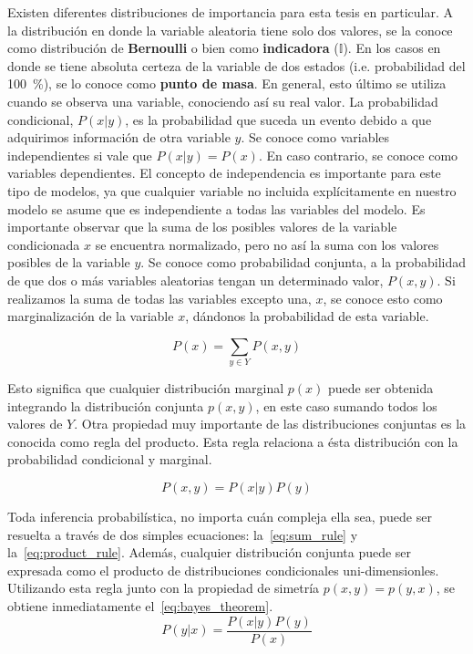 \documentclass[11pt,twoside, spanish]{report} %
\begin{document}
Existen diferentes distribuciones de importancia para esta tesis en particular.
A la distribuci\'on en donde la variable aleatoria tiene solo dos valores, se la conoce como distribuci\'on de \textbf{Bernoulli} o bien como \textbf{indicadora} ($\mathbb{I}$).
En los casos en donde se tiene absoluta certeza de la variable de dos estados (i.e. probabilidad del \SI{100}{\percent}),  se lo conoce como \textbf{punto de masa}.
En general, esto \'ultimo se utiliza cuando se observa una variable, conociendo as\'i su real valor.
La probabilidad condicional, $P(x|y)$, es la probabilidad que suceda un evento debido a que adquirimos  informaci\'on de otra variable $y$.
Se conoce como variables independientes si vale que $P(x|y) = P(x)$.
En caso contrario, se conoce como variables dependientes.
El concepto de independencia es importante para este tipo de modelos, ya que cualquier variable no incluida expl\'icitamente en nuestro modelo se asume que es independiente a todas las variables del modelo.
Es importante observar que la suma de los posibles valores de la variable condicionada $x$ se encuentra normalizado, pero no as\'i la suma con los valores posibles de la variable $y$.
Se conoce como probabilidad conjunta, a la probabilidad de que dos o m\'as variables aleatorias tengan un determinado valor, $P(x,y)$.
Si realizamos la suma de todas las variables excepto una, $x$, se conoce esto como marginalizaci\'on de la variable $x$, d\'andonos la probabilidad de esta variable.


\begin{equation} \label{eq:sum_rule}
\tag{regla de la suma}
P(x) = \sum_{y \in Y} P(x,y)
\end{equation}

Esto significa que cualquier distribuci\'on marginal $p(x)$ puede ser obtenida integrando la distribuci\'on conjunta $p(x,y)$, en este caso sumando todos los valores de $Y$.
Otra propiedad muy importante de las distribuciones conjuntas es la conocida como regla del producto.
Esta regla relaciona a \'esta distribuci\'on con la probabilidad condicional y marginal.

\begin{equation}\label{eq:product_rule}
\tag{regla del producto}
P(x,y) = P(x|y) P(y)
\end{equation}
%


Toda inferencia probabil\'istica, no importa cu\'an compleja ella sea, puede ser resuelta a trav\'es de dos simples ecuaciones: la~\ref{eq:sum_rule} y la~\ref{eq:product_rule}.
Adem\'as, cualquier distribuci\'on conjunta puede ser expresada como el producto de distribuciones condicionales uni-dimensionles.
Utilizando esta regla junto con la propiedad de simetr\'ia $p(x,y) = p(y,x)$, se obtiene inmediatamente el~\ref{eq:bayes_theorem}.
%
\begin{equation}\label{eq:bayes_theorem}
\tag{teorema de Bayes}
P(y|x) = \frac{P(x|y)P(y)}{P(x)}
\end{equation}
%
\end{document}
